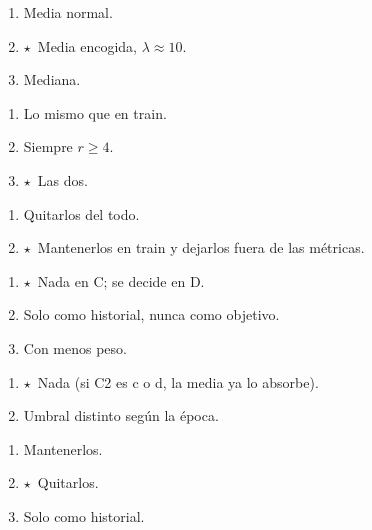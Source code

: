 \documentclass[a4paper,11pt]{article}
\newcommand{\rec}{\ensuremath{\star}}
\begin{document}
\begin{enumerate}[label=\alph*)]
  \item Media normal.
  \item \rec\ Media encogida, $\lambda\approx10$.
  \item Mediana.
\end{enumerate}

\begin{enumerate}[label=\alph*)]
  \item Lo mismo que en train.
  \item Siempre $r\ge4$.
  \item \rec\ Las dos.
\end{enumerate}

\begin{enumerate}[label=\alph*)]
  \item Quitarlos del todo.
  \item \rec\ Mantenerlos en train y dejarlos fuera de las métricas.
\end{enumerate}

\begin{enumerate}[label=\alph*)]
  \item \rec\ Nada en C; se decide en D.
  \item Solo como historial, nunca como objetivo.
  \item Con menos peso.
\end{enumerate}

\begin{enumerate}[label=\alph*)]
  \item \rec\ Nada (si C2 es c o d, la media ya lo absorbe).
  \item Umbral distinto según la época.
\end{enumerate}

\begin{enumerate}[label=\alph*)]
  \item Mantenerlos.
  \item \rec\ Quitarlos.
  \item Solo como historial.
\end{enumerate}
\end{document}
